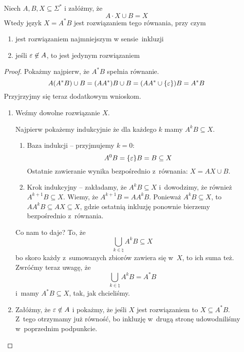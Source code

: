 \begin{lemma}
    Niech \(A, B, X \subseteq \Sigma^*\) i załóżmy, że
    \begin{equation*}
        A\cdot X \cup B = X
    \end{equation*}
    Wtedy język \(X = A^*B\) jest rozwiązaniem tego równania, przy czym
    \begin{enumerate}[label={(\roman*)}]
        \item jest rozwiązaniem najmniejszym w sensie~inkluzji
        \item jeśli \(\varepsilon \not\in A\), to jest jedynym rozwiązaniem
    \end{enumerate}
\end{lemma}
\begin{proof} 
    Pokażmy najpierw, że \(A^*B\) spełnia równanie.
    \begin{equation*}
        A\pars{A^*B} \cup B
            = \pars{AA^*}B \cup B
            = \pars{AA^*\cup \set{\eps}}B
            = A^*B
    \end{equation*}
    Przyjrzyjmy się teraz dodatkowym wnioskom.
    \begin{enumerate}[label={(\roman*)}]
        \item Weźmy dowolne rozwiązanie \(X\).
        
            Najpierw pokażemy indukcyjnie że dla każdego \( k \) mamy \( A^kB \subseteq X \).
            \begin{enumerate}[label={{\arabic*}.}]
                \item Baza indukcji -- przyjmujemy \(k = 0\):
                    \begin{equation*}
                        A^0B = \set{\eps}B = B \subseteq X
                    \end{equation*}
                    Ostatnie zawieranie wynika bezpośrednio z~równania: \(X = AX \cup B\).
                \item Krok indukcyjny -- zakładamy, że \(A^kB \subseteq X\) i~dowodzimy, że również \(A^{k + 1}B \subseteq X\). Wiemy, że \(A^{k + 1}B = AA^kB\). Ponieważ \(A^kB \subseteq X\), to \(AA^kB \subseteq AX \subseteq X\), gdzie ostatnią inkluzję ponownie bierzemy bezpośrednio z~równania.
            \end{enumerate}
            Co nam to daje? To, że
            \begin{equation*}
                \bigcup_{k \in \natural} A^kB \subseteq X
            \end{equation*}
            bo skoro każdy z~sumowanych zbiorów zawiera się w~\(X\), to ich suma też. Zwróćmy teraz uwagę, że
            \begin{equation*}
                \bigcup_{k \in \natural} A^kB = A^*B
            \end{equation*}
            i~mamy \(A^*B \subseteq X\), tak, jak chcieliśmy.
        \item Załóżmy, że \( \varepsilon \notin A\) i pokażmy, że jeśli \(X\) jest rozwiązaniem to \(X \subseteq A^*B\). Z~tego otrzymamy już równość, bo inkluzję w~drugą stronę udowodniliśmy w~poprzednim podpunkcie.
            

\end{enumerate}
\end{proof}
